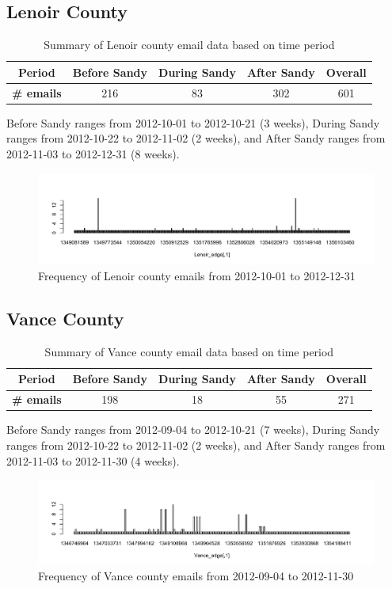 \documentclass[a4paper]{article}
\begin{document}
\subsection{Lenoir County}
\footnotesize
\begin{table}[ht]
	\centering
	\begin{tabular}{ |c|ccc|c| } 
		\hline 
		\textbf{Period} &\textbf{Before Sandy} & \textbf{During Sandy} & \textbf{After Sandy} & \textbf{Overall} \\ 	\hline
		\textbf{\# emails}& 216 & 83 & 302 & 601 \\ 
		\hline
	\end{tabular}
	\caption{ Summary of Lenoir county email data based on time period}
	\label{table:nullDare22}
\end{table}
\normalsize
Before Sandy ranges from 2012-10-01 to 2012-10-21 (3 weeks), During Sandy ranges from 2012-10-22 to 2012-11-02 (2 weeks), and After Sandy ranges from 2012-11-03 to 2012-12-31 (8 weeks).
\footnotesize
\begin{figure}[ht]
	\centering
	\includegraphics[width=1.1\textwidth]{LenoirEmails.pdf} 
	\caption{Frequency of Lenoir county emails from 2012-10-01 to 2012-12-31  }
	\label{fig:Emailplots32}
\end{figure}
\newpage
\subsection{Vance County}
\footnotesize
\footnotesize
\begin{table}[ht]
	\centering
	\begin{tabular}{ |c|ccc|c| } 
		\hline 
		\textbf{Period} &\textbf{Before Sandy} & \textbf{During Sandy} & \textbf{After Sandy} & \textbf{Overall} \\ 	\hline
		\textbf{\# emails}& 198& 18 & 55 & 271 \\ 
		\hline
	\end{tabular}
	\caption{ Summary of Vance county email data based on time period}
	\label{table:nullVance}
\end{table}
\normalsize
Before Sandy ranges from 2012-09-04 to 2012-10-21 (7 weeks), During Sandy ranges from 2012-10-22 to 2012-11-02 (2 weeks), and After Sandy ranges from 2012-11-03 to 2012-11-30  (4 weeks).
\footnotesize
\begin{figure}[ht]
	\centering
	\includegraphics[width=1.1\textwidth]{VanceEmails.pdf} 
	\caption{Frequency of Vance county emails from 2012-09-04 to 2012-11-30  }
	\label{fig:Emailplots22}
\end{figure}
\end{document}
